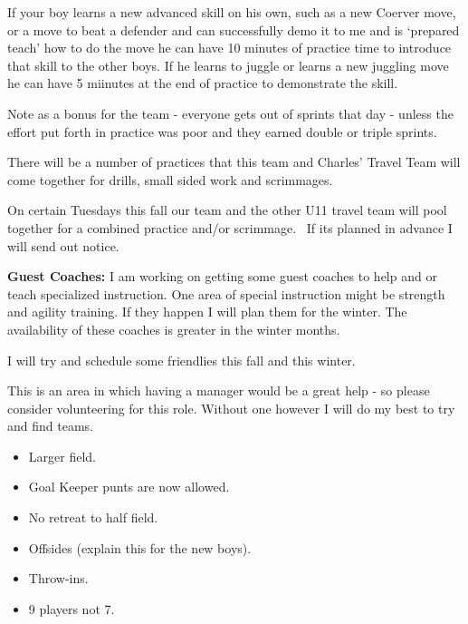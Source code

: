 \documentclass[10pt,letterpaper]{article}
\newenvironment{agendablock}[1]{%
    \tcolorbox[beamer,%
    noparskip,breakable,
    colback=LightGray,colframe=Black,%
    colbacklower=Gray!75!LightGray,%
    title=#1]}%
    {\endtcolorbox}
\newenvironment{evenBlock}[1]{%
    \tcolorbox[beamer,%
    noparskip,breakable,
    colback=LightGreen,colframe=DarkGreen,%
    colbacklower=LimeGreen!75!LightGreen,%
    title=#1]}%
    {\endtcolorbox}
\begin{document}
\begin{agendablock}{Skill Building Encouragement and Leadership}
If your boy learns a new advanced skill on his own, such as a new Coerver move, or a move to beat a defender and can successfully demo it to me and is `prepared teach' how to do the move he can have 10 minutes of practice time to introduce that skill to the other boys.  If he learns to juggle or learns a new juggling move he can have 5 miinutes at the end of practice to demonstrate the skill.

Note as a bonus for the team - everyone gets out of sprints that day - unless the effort put forth in practice was poor and they earned double or triple sprints.
\end{agendablock}

\begin{agendablock}{Practice Variations}
There will be a number of practices that this team and Charles' Travel Team will come together for drills, small sided work and scrimmages.

On certain Tuesdays this fall our team and the other U11 travel team will pool together for a combined practice and/or scrimmage.  If its planned in advance I will send out notice.

\textbf{Guest Coaches:}
I am working on getting some guest coaches to help and or teach specialized instruction.  One area of special instruction might be strength and agility training.  If they happen I will plan them for the winter.  The availability of these coaches is greater in the winter months.
\end{agendablock}

\begin{agendablock}{Friendly Scrimmages}
I will try and schedule some friendlies this fall and this winter.

This is an area in which having a manager would be a great help - so please consider volunteering for this role.
Without one however I will do my best to try and find teams.

\end{agendablock}

\begin{evenBlock}{U10 vs U11 Rule Changes}
    \begin{itemize}
        \item Larger field.
        \item Goal Keeper punts are now allowed.
        \item No retreat to half field.
        \item Offsides (explain this for the new boys).
        \item Throw-ins.
        \item 9 players not 7.
    \end{itemize}
\end{evenBlock}
\end{document}
